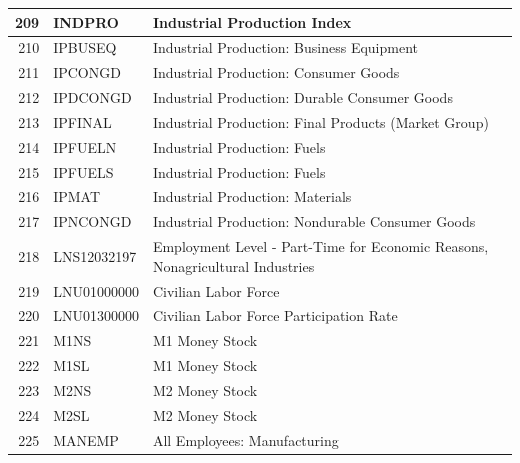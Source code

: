 \documentclass[12pt]{article}
\begin{document}
\begin{table}
\begin{tabular}{rp{5cm}p{11cm}}
  \hline
	209 & INDPRO & Industrial Production Index \\
  \hline
	210 & IPBUSEQ & Industrial Production: Business Equipment \\
  \hline
	211 & IPCONGD & Industrial Production: Consumer Goods \\
  \hline
	212 & IPDCONGD & Industrial Production: Durable Consumer Goods \\
  \hline
	213 & IPFINAL & Industrial Production: Final Products (Market Group) \\
  \hline
	214 & IPFUELN & Industrial Production: Fuels \\
  \hline
	215 & IPFUELS & Industrial Production: Fuels \\
  \hline
	216 & IPMAT & Industrial Production: Materials \\
  \hline
	217 &IPNCONGD & Industrial Production: Nondurable Consumer Goods \\
  \hline
	218 & LNS12032197 & Employment Level - Part-Time for Economic Reasons, Nonagricultural Industries \\
  \hline
	219 & LNU01000000 & Civilian Labor Force \\
  \hline
	220 & LNU01300000 & Civilian Labor Force Participation Rate \\
  \hline
	221 & M1NS & M1 Money Stock \\
  \hline
	222 & M1SL & M1 Money Stock \\
  \hline
	223 & M2NS & M2 Money Stock \\
  \hline
	224 & M2SL & M2 Money Stock \\
  \hline
	225 & MANEMP & All Employees: Manufacturing \\
\end{tabular}
\end{table}
\end{document}
